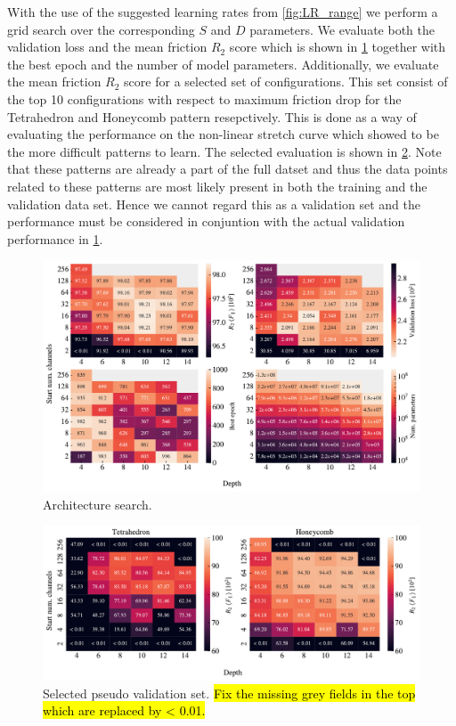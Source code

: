 With the use of the suggested learning rates from \cref{fig:LR_range} we perform
a grid search over the corresponding $S$ and $D$ parameters. We evaluate both
the validation loss and the mean friction $R_2$ score which is shown in
\cref{fig:A_search_perf} together with the best epoch and the number of model
parameters. Additionally, we evaluate the mean friction $R_2$ score for a
selected set of configurations. This set consist of the top 10 configurations
with respect to maximum friction drop for the Tetrahedron and Honeycomb pattern
resepctively. This is done as a way of evaluating the performance on the
non-linear stretch curve which showed to be the more difficult patterns to
learn. The selected evaluation is shown in \cref{fig:A_search_compare}. Note
that these patterns are already a part of the full datset and thus the data points
related to these patterns are most likely present in both the training and the validation data set. Hence we cannot regard this as a validation set and the performance must be considered in conjuntion with the actual validation performance in \cref{fig:A_search_perf}.

\begin{figure}[H]
  \centering
  \includegraphics[width=\linewidth]{figures/ML/A_search_perf.pdf}
  \caption{Architecture search.}
  \label{fig:A_search_perf}
\end{figure}  

\begin{figure}[H]
  \centering
  \includegraphics[width=\linewidth]{figures/ML/A_search_compare_perf}
  \caption{Selected pseudo validation set. \hl{Fix the missing grey fields in the top which are replaced by < 0.01.}}
  \label{fig:A_search_compare}
\end{figure}  

